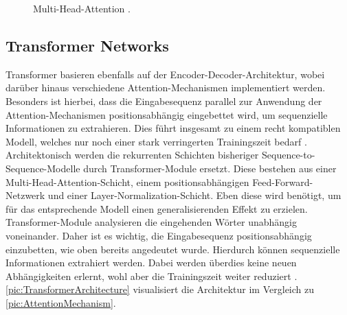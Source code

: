 \begin{figure}[h!]
  \centering
  \caption{Multi-Head-Attention \cite[S.~400]{ZHA20}.}
  \label{pic:MultiHeadAttention}
\end{figure}


\subsection{Transformer Networks}
\noindent
Transformer basieren ebenfalls auf der Encoder-Decoder-Architektur, wobei darüber hinaus verschiedene Attention-Mechanismen implementiert werden. Besonders ist hierbei, dass die Eingabesequenz parallel zur Anwendung der Attention-Mechanismen positionsabhängig eingebettet wird, um sequenzielle Informationen zu extrahieren. Dies führt insgesamt zu einem recht kompatiblen Modell, welches nur noch einer stark verringerten Trainingszeit bedarf \cite[S.~398]{ZHA20}.\\

\noindent
Architektonisch werden die rekurrenten Schichten bisheriger Sequence-to-Sequence-Modelle durch Transformer-Module ersetzt. Diese bestehen aus einer Multi-Head-Attention-Schicht, einem positionsabhängigen Feed-Forward-Netzwerk und einer Layer-Normalization-Schicht. Eben diese wird benötigt, um für das entsprechende Modell einen generalisierenden Effekt zu erzielen. Transformer-Module analysieren die eingehenden Wörter unabhängig voneinander. Daher ist es wichtig, die Eingabesequenz positionsabhängig einzubetten, wie oben bereits angedeutet wurde. Hierdurch können sequenzielle Informationen extrahiert werden. Dabei werden überdies keine neuen Abhängigkeiten erlernt, wohl aber die Trainingszeit weiter reduziert \cite[S.~399-404]{ZHA20}. \autoref{pic:TransformerArchitecture} visualisiert die Architektur im Vergleich zu \autoref{pic:AttentionMechanism}.
\newpage

